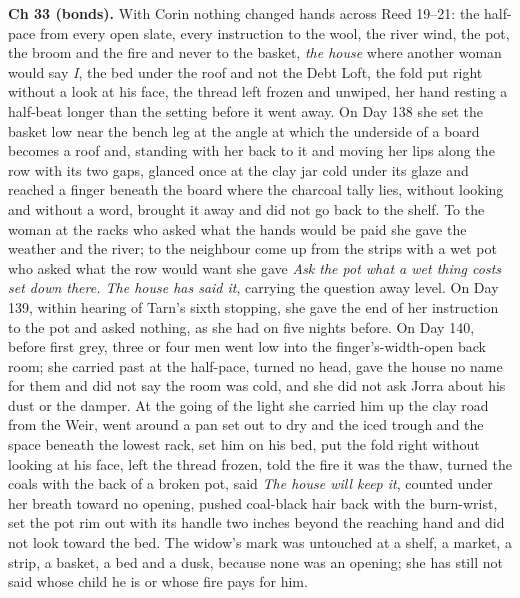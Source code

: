 \documentclass{design/chronicle}
\begin{document}
{\textbf{Ch 33 (bonds).} With Corin nothing changed hands across Reed 19–21: the half-pace from every open slate, every instruction to the wool, the river wind, the pot, the broom and the fire and never to the basket, \emph{the house} where another woman would say \emph{I}, the bed under the roof and not the Debt Loft, the fold put right without a look at his face, the thread left frozen and unwiped, her hand resting a half-beat longer than the setting before it went away. On Day 138 she set the basket low near the bench leg at the angle at which the underside of a board becomes a roof and, standing with her back to it and moving her lips along the row with its two gaps, glanced once at the clay jar cold under its glaze and reached a finger beneath the board where the charcoal tally lies, without looking and without a word, brought it away and did not go back to the shelf. To the woman at the racks who asked what the hands would be paid she gave the weather and the river; to the neighbour come up from the strips with a wet pot who asked what the row would want she gave \emph{Ask the pot what a wet thing costs set down there. The house has said it}, carrying the question away level. On Day 139, within hearing of Tarn’s sixth stopping, she gave the end of her instruction to the pot and asked nothing, as she had on five nights before. On Day 140, before first grey, three or four men went low into the finger’s-width-open back room; she carried past at the half-pace, turned no head, gave the house no name for them and did not say the room was cold, and she did not ask Jorra about his dust or the damper. At the going of the light she carried him up the clay road from the Weir, went around a pan set out to dry and the iced trough and the space beneath the lowest rack, set him on his bed, put the fold right without looking at his face, left the thread frozen, told the fire it was the thaw, turned the coals with the back of a broken pot, said \emph{The house will keep it}, counted under her breath toward no opening, pushed coal-black hair back with the burn-wrist, set the pot rim out with its handle two inches beyond the reaching hand and did not look toward the bed. The widow’s mark was untouched at a shelf, a market, a strip, a basket, a bed and a dusk, because none was an opening; she has still not said whose child he is or whose fire pays for him.

}
\end{document}
